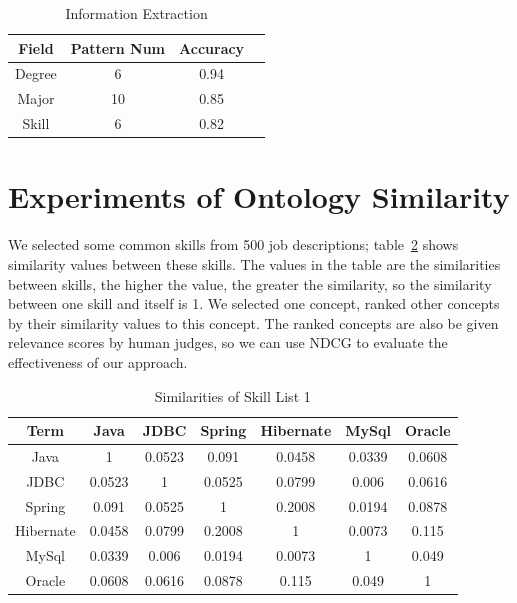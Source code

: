 \begin{table}[ht]
\caption{Information Extraction} %
\centering %
\begin{tabular}{   | c | c | c | c |   }
 \hline
                     Field   & Pattern Num & Accuracy     \\
 \hline
                     Degree & 6         & 0.94         \\
 \hline
                     Major  & 10        & 0.85      \\
 \hline
                     Skill  & 6         & 0.82      \\
 \hline
\end{tabular}
\label{tab:ieaccura} %
\end{table}

\section{Experiments of Ontology Similarity}

We selected some common skills from 500 job descriptions; table~\ref{tab:dismatrix3} shows similarity values between these skills. The values in the table are the similarities between skills, the higher the value, the greater the similarity, so the similarity between one skill and itself is 1. We selected one concept, ranked other concepts by their similarity values to this concept. The ranked concepts are also be given relevance scores by human judges, so we can use NDCG to evaluate the effectiveness of our approach.

\begin{table}

\caption{Similarities of Skill List 1}
\begin{tabular}{ c | c c c c c c   }
 \hline
  Term       &  Java  &  JDBC  & Spring & Hibernate & MySql  & Oracle   \\  \hline
  Java   &   1    & 0.0523 & 0.091  &   0.0458  & 0.0339 & 0.0608    \\  \hline
    JDBC   & 0.0523 &   1    & 0.0525 &   0.0799  & 0.006  & 0.0616   \\  \hline
   Spring  & 0.091  & 0.0525 &   1    &   0.2008  & 0.0194 & 0.0878   \\  \hline
 Hibernate & 0.0458 & 0.0799 & 0.2008 &     1     & 0.0073 & 0.115    \\  \hline
   MySql   & 0.0339 & 0.006  & 0.0194 &   0.0073  &   1    & 0.049    \\  \hline
   Oracle  & 0.0608 & 0.0616 & 0.0878 &   0.115   & 0.049  &   1      \\  \hline
 \hline
\end{tabular}
\label{tab:dismatrix3}
\end{table}

